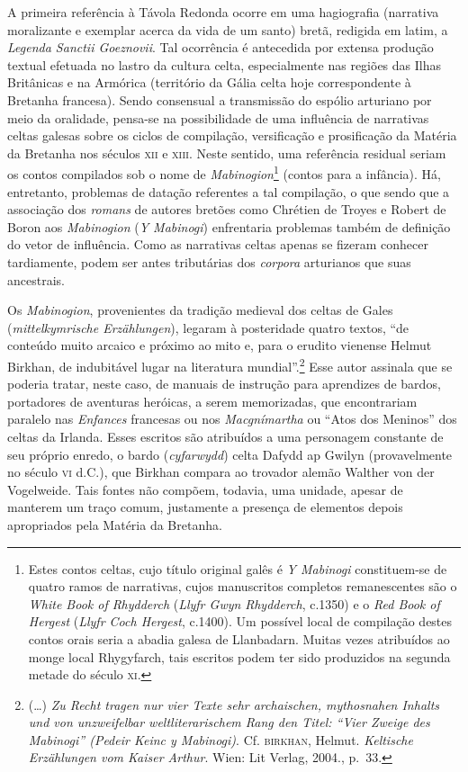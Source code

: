 A primeira referência à Távola Redonda ocorre em uma hagiografia
(narrativa moralizante e exemplar acerca da vida de um santo) bretã,
redigida em latim, a \textit{Legenda Sanctii Goeznovii}. Tal ocorrência
é antecedida por extensa produção textual efetuada no lastro da cultura
celta, especialmente nas regiões das Ilhas Britânicas e na Armórica
(território da Gália celta hoje correspondente à Bretanha francesa).
Sendo consensual a transmissão do espólio arturiano por meio da
oralidade, pensa-se na possibilidade de uma influência de narrativas
celtas galesas sobre os ciclos de compilação, versificação e
prosificação da Matéria da Bretanha nos séculos \textsc{xii} e \textsc{xiii}. Neste
sentido, uma referência residual seriam os contos compilados sob o nome
de \textit{Mabinogion}\footnote{ Estes contos celtas, cujo título
original galês é \textit{Y Mabinogi} constituem-se de quatro ramos de
narrativas, cujos manuscritos completos remanescentes são o
\textit{White Book of Rhydderch} (\textit{Llyfr Gwyn Rhydderch},
c.1350) e o \textit{Red Book of Hergest} (\textit{Llyfr Coch Hergest},
c.1400). Um possível local de compilação destes contos orais seria a
abadia galesa de Llanbadarn. Muitas vezes atribuídos ao monge local
Rhygyfarch, tais escritos podem ter sido produzidos na segunda metade
do século \textsc{xi}.} (contos para a infância). Há, entretanto, problemas de
datação referentes a tal compilação, o que sendo que a associação dos
\textit{romans} de autores bretões como Chrétien de Troyes e Robert de
Boron aos \textit{Mabinogion} (\textit{Y Mabinogi}) enfrentaria
problemas também de definição do vetor de influência. Como as
narrativas celtas apenas se fizeram conhecer tardiamente, podem ser
antes tributárias dos \textit{corpora} arturianos que suas ancestrais.

Os \textit{Mabinogion}, provenientes da tradição medieval dos celtas de
Gales (\textit{mittelkymrische Erzählungen}), legaram à posteridade
quatro textos, “de conteúdo muito arcaico e próximo ao mito e, para o
erudito vienense Helmut Birkhan, de indubitável lugar na literatura
mundial”.\footnote{ (\ldots{}) \textit{Zu Recht tragen nur vier Texte sehr
archaischen, mythosnahen Inhalts und von unzweifelbar weltliterarischem
Rang den Titel: “Vier Zweige des Mabinogi” (Pedeir Keinc y Mabinogi)}.
Cf. \textsc{birkhan}, Helmut. \textit{Keltische Erzählungen vom Kaiser Arthur}.
Wien: Lit Verlag, 2004., p.~33.} Esse autor assinala que se poderia
tratar, neste caso, de manuais de instrução para aprendizes de bardos,
portadores de aventuras heróicas, a serem memorizadas, que encontrariam
paralelo nas \textit{Enfances} francesas ou nos \textit{Macgnímartha}
ou “Atos dos Meninos” dos celtas da Irlanda. Esses escritos são
atribuídos a uma personagem constante de seu próprio enredo, o bardo
(\textit{cyfarwydd}) celta Dafydd ap Gwilyn (provavelmente no século \textsc{vi}
d.C.), que Birkhan compara ao trovador alemão Walther von der
Vogelweide. Tais fontes não compõem, todavia, uma unidade, apesar de
manterem um traço comum, justamente a presença de elementos depois
apropriados pela Matéria da Bretanha. 

